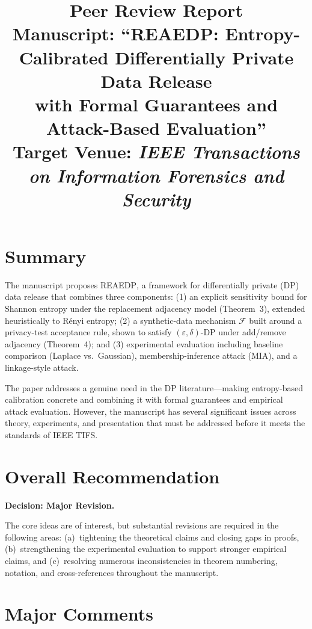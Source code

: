 \documentclass[12pt]{article}
\title{\textbf{Peer Review Report}\\[0.5em]
\large Manuscript: ``REAEDP: Entropy-Calibrated Differentially Private Data Release\\
with Formal Guarantees and Attack-Based Evaluation''\\[0.3em]
\normalsize Target Venue: \textit{IEEE Transactions on Information Forensics and Security}}
\date{}
\begin{document}
\maketitle
\tableofcontents
\newpage

\section{Summary}

The manuscript proposes \textsc{REAEDP}, a framework for differentially private (DP) data release that combines three components: (1) an explicit sensitivity bound for Shannon entropy under the replacement adjacency model (Theorem~3), extended heuristically to R\'{e}nyi entropy; (2) a synthetic-data mechanism $\mathcal{F}$ built around a privacy-test acceptance rule, shown to satisfy $(\varepsilon,\delta)$-DP under add/remove adjacency (Theorem~4); and (3) experimental evaluation including baseline comparison (Laplace vs.\ Gaussian), membership-inference attack (MIA), and a linkage-style attack.

The paper addresses a genuine need in the DP literature---making entropy-based calibration concrete and combining it with formal guarantees and empirical attack evaluation. However, the manuscript has several significant issues across theory, experiments, and presentation that must be addressed before it meets the standards of IEEE TIFS.

\section{Overall Recommendation}

\textbf{Decision: Major Revision.}

The core ideas are of interest, but substantial revisions are required in the following areas: (a)~tightening the theoretical claims and closing gaps in proofs, (b)~strengthening the experimental evaluation to support stronger empirical claims, and (c)~resolving numerous inconsistencies in theorem numbering, notation, and cross-references throughout the manuscript.

\section{Major Comments}
\end{document}
